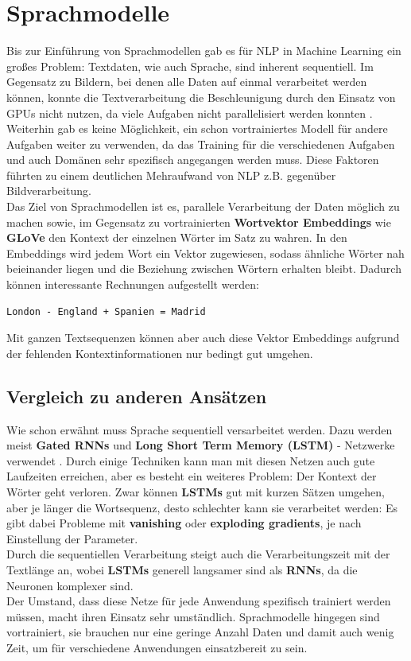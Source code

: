 \chapter{Sprachmodelle}
Bis zur Einf\"uhrung von Sprachmodellen gab es f\"ur NLP in Machine Learning ein gro{\ss}es Problem: Textdaten, wie auch Sprache, sind inherent sequentiell. Im Gegensatz zu Bildern, bei denen alle Daten auf einmal verarbeitet werden k\"onnen, konnte die Textverarbeitung die Beschleunigung durch den Einsatz von GPUs nicht nutzen, da viele Aufgaben nicht parallelisiert werden konnten \cite{attention}.\\ Weiterhin gab es keine M\"oglichkeit, ein schon vortrainiertes Modell f\"ur andere Aufgaben weiter zu verwenden, da das Training f\"ur die verschiedenen Aufgaben und auch Dom\"anen sehr spezifisch angegangen werden muss. Diese Faktoren f\"uhrten zu einem deutlichen Mehraufwand von NLP z.B. gegen\"uber Bildverarbeitung.\\
Das Ziel von Sprachmodellen ist es, parallele Verarbeitung der Daten m\"oglich zu machen sowie, im Gegensatz zu vortrainierten \textbf{Wortvektor Embeddings} wie \textbf{GLoVe} den Kontext der einzelnen W\"orter im Satz zu wahren. In den Embeddings wird jedem Wort ein Vektor zugewiesen, sodass \"ahnliche W\"orter nah beieinander liegen und die Beziehung zwischen W\"ortern erhalten bleibt. Dadurch k\"onnen interessante Rechnungen aufgestellt werden:
\begin{verbatim} 
London - England + Spanien = Madrid
\end{verbatim} 
Mit ganzen Textsequenzen k\"onnen aber auch diese Vektor Embeddings aufgrund der fehlenden Kontextinformationen nur bedingt gut umgehen.


\section{Vergleich zu anderen Ans\"atzen}
Wie schon erw\"ahnt muss Sprache sequentiell versarbeitet werden. Dazu werden meist \textbf{Gated RNNs} und \textbf{Long Short Term Memory (LSTM)} - Netzwerke verwendet \cite{attention}. Durch einige Techniken kann man mit diesen Netzen auch gute Laufzeiten erreichen, aber es besteht ein weiteres Problem: Der Kontext der W\"orter geht verloren. Zwar k\"onnen \textbf{LSTMs} gut mit kurzen S\"atzen umgehen, aber je l\"anger die Wortsequenz, desto schlechter kann sie verarbeitet werden: Es gibt dabei Probleme mit \textbf{vanishing} oder \textbf{exploding gradients}, je nach Einstellung der Parameter.\\
Durch die sequentiellen Verarbeitung steigt auch die Verarbeitungszeit mit der Textl\"ange an, wobei \textbf{LSTMs} generell langsamer sind als \textbf{RNNs}, da die Neuronen komplexer sind.\\
Der Umstand, dass diese Netze f\"ur jede Anwendung spezifisch trainiert werden m\"ussen, macht ihren Einsatz sehr umst\"andlich. Sprachmodelle hingegen sind vortrainiert, sie brauchen nur eine geringe Anzahl Daten und damit auch wenig Zeit, um f\"ur verschiedene Anwendungen einsatzbereit zu sein.


